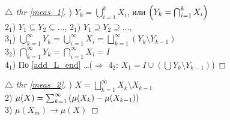 
\begin{minipage}[t]{0.45\textwidth}
\begin{proof}[
{$\triangle$} 
thr \eqref{meas_1}]

\phantom{42}

) $Y_k = \bigcup_{i=1}^{k} X_i$, или $\left(Y_k = \bigcap_{i=1}^{k} X_i\right)$ \\
2$_1$) $Y_1 \subseteq Y_2 \subseteq \dots$, 
2$_1$) $Y_1 \supseteq Y_2 \supseteq \dots$, \\
3$_1$) $\bigcup_{k=1}^{\infty} Y_k = \bigcup_{i=1}^{\infty} X_i = \bigsqcup_{k=1}^{\infty} (Y_k \setminus Y_{k-1})$ \\
3$_2$) $\bigcap_{k=1}^{\infty} Y_k = \bigcap_{i=1}^{\infty} X_i = I$ \\
4$_1$) По \eqref{add_L_end} \dots ($\Rightarrow$ $4_2$: $X_1 = I \cup (\bigcup Y_k \setminus Y_{k-1})$)
\end{proof}

\begin{proof}[
\hypertarget{meas_2_link}{$\triangle$} 
thr \eqref{meas_2}]

\phantom{42}

) $X = \bigsqcup_{k=1}^{\infty} X_k \setminus X_{k-1}$ \\
2) $\mu(X) = \sum_{k=1}^{\infty}\left(\mu(X_k) - \mu(X_{k-1})\right)$ \\
3) $\mu(X_m) \to \mu(X) $
\end{proof}
\end{minipage}
\hfill
